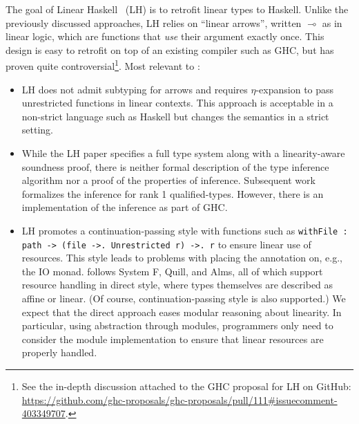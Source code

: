 The goal of Linear Haskell~\citep{DBLP:journals/pacmpl/BernardyBNJS18}
(LH) is to retrofit linear types to Haskell.
Unlike the previously discussed approaches, LH relies on ``linear
arrows'', written $\multimap$ as in linear logic, 
which are functions that \emph{use} their argument exactly once.
This design is easy to retrofit on top of an existing compiler
such as GHC, but has proven quite controversial\footnote{
  See the in-depth discussion attached to the GHC proposal for LH on GitHub: \url{https://github.com/ghc-proposals/ghc-proposals/pull/111\#issuecomment-403349707}.}.
Most relevant to \lang:
\begin{itemize}[leftmargin=*]
\item LH does not admit subtyping for arrows and requires
  $\eta$-expansion to pass unrestricted functions in linear
  contexts. This approach is acceptable in a non-strict language such as
  Haskell but changes the semantics in a strict setting.
\item
  While the LH paper specifies a full type system along with a
  linearity-aware soundness proof, there is neither formal description of
  the type inference algorithm nor a proof of the properties of inference.
  Subsequent work~\cite{DBLP:journals/corr/abs-1911-00268}
  formalizes the inference for rank 1 qualified-types.
  However, there is an implementation of the inference as part of GHC.
\item
  LH promotes a continuation-passing style with functions such as
  \lstinline/withFile : path -> (file ->. Unrestricted r) ->. r/
  to ensure linear use of resources. This style leads to problems with
  placing the annotation on, e.g., the IO monad.
  \lang follows System F\degree, Quill, and Alms, all of which support
  resource handling in direct style, where types themselves are
  described as affine or linear. (Of course, continuation-passing
  style is also supported.)
  We expect that the direct approach eases modular reasoning about linearity.
  In particular, using abstraction through modules,
  programmers only need to consider the module
  implementation to ensure that linear
  resources are properly handled.
\end{itemize}

